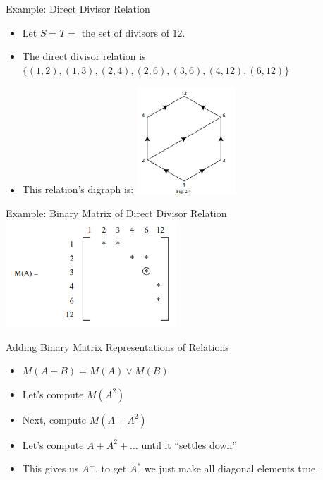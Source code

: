 \documentclass{beamer}
\begin{document}
\begin{frame}{Example: Direct Divisor Relation}
    \begin{itemize}[<+->]
        \item Let $S=T=$ the set of divisors of 12.
        \item The direct divisor relation is
            \newline$\{(1,2),(1,3),(2,4),(2,6),(3,6),(4,12),(6,12)\}$
        \item This relation's digraph is:
            \newline\includegraphics[height=4cm]{images/divisor-graph}
    \end{itemize}
\end{frame}

\begin{frame}{Example: Binary Matrix of Direct Divisor Relation}
    \includegraphics[height=4cm]{images/divisor-binmatrix}
\end{frame}

\begin{frame}{Adding Binary Matrix Representations of Relations}
    \begin{itemize}[<+->]
        \item $M(A+B) = M(A) \vee M(B)$
        \item Let's compute $M(A^2)$
        \item Next, compute $M(A+A^2)$
        \item Let's compute $A + A^2 + \ldots$ until it ``settles
        down''
        \item This gives us $A^+$, to get $A^*$ we just make all
        diagonal elements true.
    \end{itemize}
\end{frame}
\end{document}
